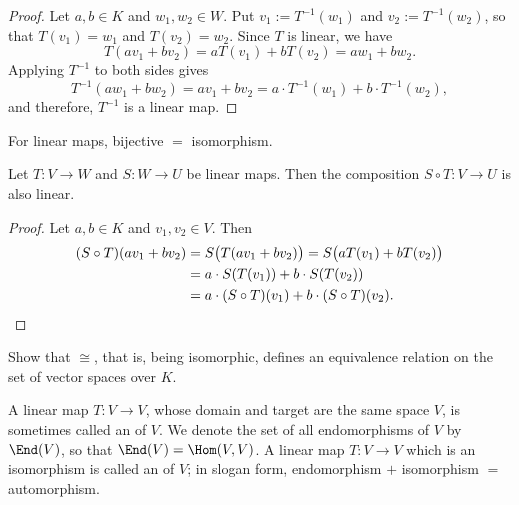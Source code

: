 \begin{proof}
Let $a, b \in K$ and $w_1, w_2 \in W$. Put $v_1 := T^{-1}(w_1)$ and $v_2 := T^{-1}(w_2)$, so that $T(v_1) = w_1$ and $T(v_2) = w_2$. Since $T$ is linear, we have
\[
T(a v_1 + b v_2) = a T(v_1) + b T(v_2) = a w_1 + b w_2.
\]
Applying $T^{-1}$ to both sides gives
\[
T^{-1}(a w_1 + b w_2) = a v_1 + b v_2 = a \cdot T^{-1}(w_1) + b \cdot T^{-1}(w_2),
\]
and therefore, $T^{-1}$ is a linear map.
\end{proof}

\begin{summary}
\label{sum:bijective_equals_iso}
For linear maps, bijective $=$ isomorphism.
\end{summary}

\begin{lemma}
\label{lem:composition_linear}
Let $T: V \to W$ and $S: W \to U$ be linear maps. Then the composition $S \circ T: V \to U$ is also linear.
\end{lemma}

\begin{proof}
Let $a, b \in K$ and $v_1, v_2 \in V$. Then
\begin{align*}
(S \circ T)(a v_1 + b v_2) &= S\big(T(a v_1 + b v_2)\big) = S\big(a T(v_1) + b T(v_2)\big) \\
&= a \cdot S(T(v_1)) + b \cdot S(T(v_2)) \\
&= a \cdot (S \circ T)(v_1) + b \cdot (S \circ T)(v_2). \qedhere
\end{align*}
\end{proof}

\begin{exercise}
\label{exc:iso_equivalence_relation}
Show that $\cong$, that is, being isomorphic, defines an equivalence relation on the set of vector spaces over $K$.
\end{exercise}

\begin{definition}
\label{def:endomorphism}
A linear map $T: V \to V$, whose domain and target are the same space $V$, is sometimes called an  of $V$. We denote the set of all endomorphisms of $V$ by $\End(V)$, so that $\End(V) = \Hom(V, V)$. A linear map $T: V \to V$ which is an isomorphism is called an  of $V$; in slogan form, endomorphism $+$ isomorphism $=$ automorphism.
\end{definition}

